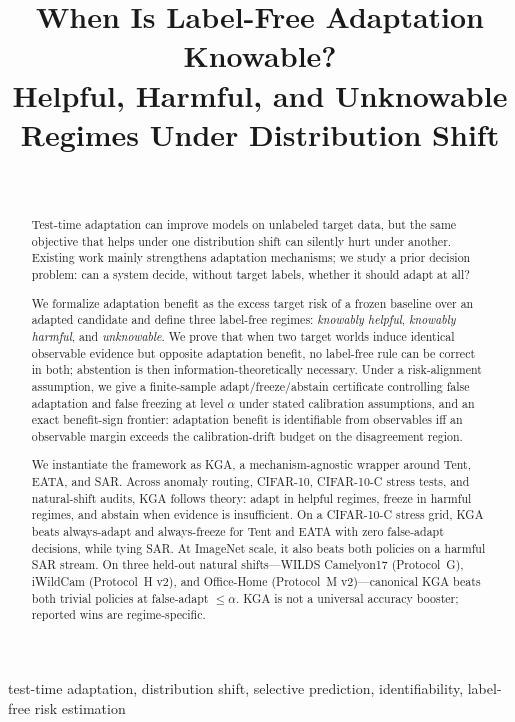 \documentclass[conference]{IEEEtran}
\title{When Is Label-Free Adaptation Knowable? \\
Helpful, Harmful, and Unknowable Regimes Under Distribution Shift}
\author{\IEEEauthorblockN{Anonymous Authors}\\
\IEEEauthorblockA{Paper under double-blind review}}
\theoremstyle{plain}
\theoremstyle{definition}
\begin{document}
\maketitle

\begin{abstract}
Test-time adaptation can improve models on unlabeled target data, but the same
objective that helps under one distribution shift can silently hurt under another.
Existing work mainly strengthens adaptation mechanisms; we study a prior decision
problem: can a system decide, without target labels, whether it should adapt at all?

We formalize adaptation benefit as the excess target risk of a frozen baseline over
an adapted candidate and define three label-free regimes: \emph{knowably helpful},
\emph{knowably harmful}, and \emph{unknowable}. We prove that when two target worlds
induce identical observable evidence but opposite adaptation benefit, no label-free
rule can be correct in both; abstention is then information-theoretically necessary.
Under a risk-alignment assumption, we give a finite-sample adapt/freeze/abstain
certificate controlling false adaptation and false freezing at level $\alpha$ under
stated calibration assumptions, and an exact benefit-sign frontier: adaptation benefit
is identifiable from observables iff an observable margin exceeds the calibration-drift
budget on the disagreement region.

We instantiate the framework as \textsc{KGA}, a mechanism-agnostic wrapper around
Tent, EATA, and SAR. Across anomaly routing, CIFAR-10, CIFAR-10-C stress tests, and
natural-shift audits, \textsc{KGA} follows theory: adapt in helpful regimes, freeze
in harmful regimes, and abstain when evidence is insufficient. On a CIFAR-10-C stress grid,
\textsc{KGA} beats always-adapt and always-freeze for Tent and EATA with zero
false-adapt decisions, while tying SAR. At ImageNet scale, it also beats both
policies on a harmful SAR stream. On three held-out natural shifts---WILDS Camelyon17
(Protocol~G), iWildCam (Protocol~H v2), and Office-Home (Protocol~M v2)---canonical
\textsc{KGA} beats both trivial policies at false-adapt $\le\alpha$.
\textsc{KGA} is not a universal accuracy booster; reported wins are regime-specific.
\end{abstract}

\begin{IEEEkeywords}
test-time adaptation, distribution shift, selective prediction, identifiability, label-free risk estimation
\end{IEEEkeywords}
\end{document}
